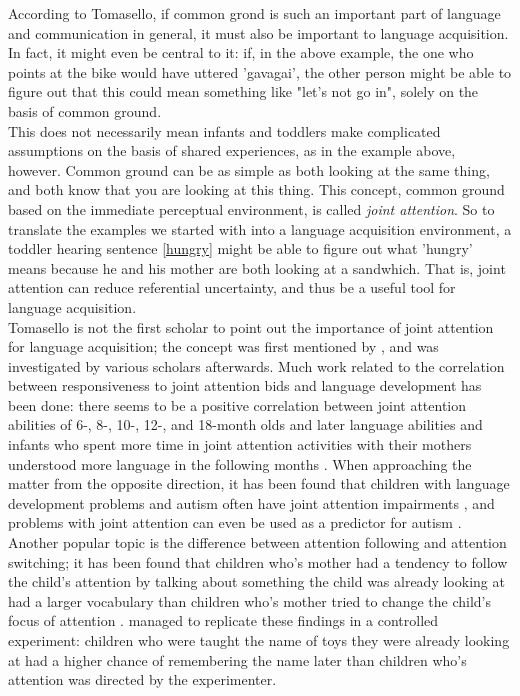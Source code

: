 \documentclass[12pt]{article}
\begin{document}
According to Tomasello, if common grond is such an important part of language and communication in general, it must also be important to language acquisition. In fact, it might even be central to it: if, in the above example, the one who points at the bike would have uttered 'gavagai', the other person might be able to figure out that this could mean something like "let's not go in", solely on the basis of common ground.\\\indent
This does not necessarily mean infants and toddlers make complicated assumptions on the basis of shared experiences, as in the example above, however. Common ground can be as simple as both looking at the same thing, and both know that you are looking at this thing. This concept, common ground based on the immediate perceptual environment, is called \emph{joint attention}. So to translate the examples we started with into a language acquisition environment, a toddler hearing sentence \ref{hungry} might be able to figure out what 'hungry' means because he and his mother are both looking at a sandwhich. That is, joint attention can reduce referential uncertainty, and thus be a useful tool for language acquisition.\\\indent
Tomasello is not the first scholar to point out the importance of joint attention for language acquisition; the concept was first mentioned by \citet{b75}, and was investigated by various scholars afterwards. Much work related to the correlation between responsiveness to joint attention bids and language development has been done: there seems to be a positive correlation between joint attention abilities of 6-, 8-, 10-, 12-, and 18-month olds and later language abilities \citep{m00, c98} and infants who spent more time in joint attention activities with their mothers understood more language in the following months \citep{c98}. When approaching the matter from the opposite direction, it has been found that children with language development problems and autism often have joint attention impairments \citep{d02, m95, m86, od94, bc97}, and problems with joint attention can even be used as a predictor for autism \citep{m90}. Another popular topic is the difference between attention following and attention switching; it has been found that children who's mother had a tendency to follow the child's attention by talking about something the child was already looking at had a larger vocabulary than children who's mother tried to change the child's focus of attention \citep{c98,tt83}. \citet{ddc93} managed to replicate these findings in a controlled experiment: children who were taught the name of toys they were already looking at had a higher chance of remembering the name later than children who's attention was directed by the experimenter. \\\indent
\end{document}

